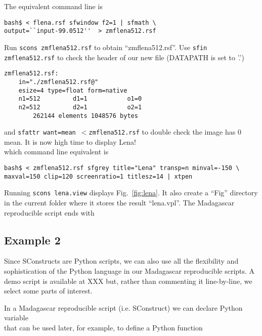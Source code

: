 
%
The equivalent command line is
%
\begin{verbatim}
bash$ < flena.rsf sfwindow f2=1 | sfmath \ 
output=``input-99.0512''  > zmflena512.rsf
\end{verbatim}
%
Run \texttt{scons zmflena512.rsf} to obtain ``zmflena512.rsf''. Use
\texttt{sfin zmflena512.rsf} to check the header of our new file
(DATAPATH is set to '.')
%
\begin{verbatim}
zmflena512.rsf:
    in="./zmflena512.rsf@"
    esize=4 type=float form=native 
    n1=512         d1=1           o1=0          
    n2=512         d2=1           o2=1          
        262144 elements 1048576 bytes
\end{verbatim}
%
and \texttt{sfattr want=mean $<$zmflena512.rsf} to double check the
image has 0 mean. It is now high time to display Lena!\\
%

%
which command line equivalent is
\begin{verbatim}
bash$ < zmflena512.rsf sfgrey title="Lena" transp=n minval=-150 \
maxval=150 clip=120 screenratio=1 titlesz=14 | xtpen
\end{verbatim}
%
Running \texttt{scons lena.view} displays Fig.~\ref{fig:lena}.
%
\inputdir{easystart}
%
It also create a ``Fig'' directory in the current folder where it
stores the result ``lena.vpl''. The Madagascar reproducible script
ends with\\
%


\subsection{Example 2}

Since SConstructs are Python scripts, we can also use all the
flexibility and sophistication of the Python language in our
Madagascar reproducible scripts. A demo script is available at XXX
but, rather than commenting it line-by-line, we select some parts of
interest.

In a Madagascar reproducible script (i.e. SConstruct) we can declare
Python variable\\



\noindent that can be used later, for example, to define a Python function\\

